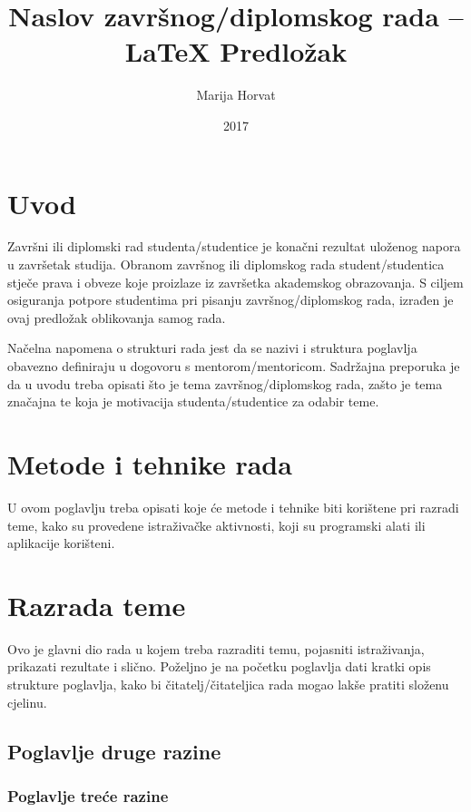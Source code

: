 \documentclass{foi}
\title{Naslov završnog/diplomskog rada -- LaTeX Predložak}
\author{Marija Horvat}
\date{2017}
\begin{document}
\maketitle

\tableofcontents

\pagestyle{plain}
\chapter{Uvod}

Završni ili diplomski rad studenta/studentice je konačni rezultat uloženog napora u završetak studija. Obranom završnog ili diplomskog rada student/studentica stječe prava i obveze koje proizlaze iz završetka akademskog obrazovanja. S ciljem osiguranja potpore studentima pri pisanju završnog/diplomskog rada, izrađen je ovaj predložak oblikovanja samog rada.

Načelna napomena o strukturi rada jest da se nazivi i struktura poglavlja obavezno definiraju u dogovoru s mentorom/mentoricom. Sadržajna preporuka je da u uvodu treba opisati što je tema završnog/diplomskog rada, zašto je tema značajna te koja je motivacija studenta/studentice za odabir teme. 

\chapter{Metode i tehnike rada}

U ovom poglavlju treba opisati koje će metode i tehnike biti korištene pri razradi teme, kako su provedene istraživačke aktivnosti, koji su programski alati ili aplikacije korišteni.

\lipsum[1-2]

\chapter{Razrada teme}

Ovo je glavni dio rada u kojem treba razraditi temu, pojasniti istraživanja, prikazati rezultate i slično. Poželjno je na početku poglavlja dati kratki opis strukture poglavlja, kako bi čitatelj/čitateljica rada mogao lakše pratiti složenu cjelinu.

\section{Poglavlje druge razine }

\lipsum[1]

\subsection{Poglavlje treće razine}
\end{document}
